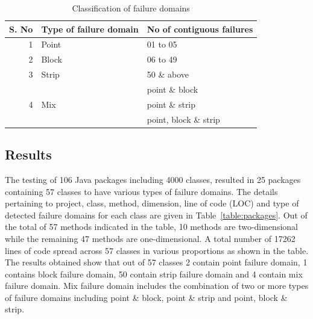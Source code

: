 \begin{table}[h]
\scriptsize
\caption{Classification of failure domains} 
\bigskip
\centering
{\renewcommand{\arraystretch}{1.5}
\begin{tabular}{| r | l | l |} 
\hline 
S. No 	&	Type of failure domain						& No of contiguous failures	 \\
				  
				 
				 
				 
\hline 
1		&	Point										 & 01 to 05							\\
\hline 
2		& 	Block										 & 06 to 49							\\
\hline 
3		&	Strip 										 & 50 \& above						 \\ 
\hline 
		&				 								 & point \& block						\\
4		& 	Mix											 & point \& strip 						\\
		&											        & point, block \& strip				\\
\hline
\end{tabular}
}
\label{table:resultsSummary} %
\end{table}
\bigskip
\bigskip


\subsection{Results}
The testing of 106 Java packages including 4000 classes, resulted in 25 packages containing 57 classes to have various types of failure domains. The details pertaining to project, class, method, dimension, line of code (LOC) and type of detected failure domains for each class are given in Table~\ref{table:packages}. Out of the total of 57 methods indicated in the table, 10 methods are two-dimensional while the remaining 47 methods are one-dimensional. A total number of 17262 lines of code spread across 57 classes in various proportions as shown in the table. The results obtained show that out of 57 classes 2 contain point failure domain, 1 contains block failure domain, 50 contain strip failure domain and 4 contain mix failure domain. Mix failure domain includes the combination of two or more types of failure domains including point \& block, point \& strip and point, block \& strip. 



